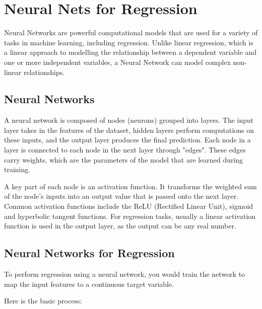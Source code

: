 \chapter{Neural Nets for Regression}

Neural Networks are powerful computational models that are used for a
variety of tasks in machine learning, including regression. Unlike
linear regression, which is a linear approach to modelling the
relationship between a dependent variable and one or more independent
variables, a Neural Network can model complex non-linear
relationships.

\section{Neural Networks}

A neural network is composed of nodes (neurons) grouped into
layers. The input layer takes in the features of the dataset, hidden
layers perform computations on these inputs, and the output layer
produces the final prediction. Each node in a layer is connected to
each node in the next layer through "edges". These edges carry
weights, which are the parameters of the model that are learned during
training.

A key part of each node is an activation function. It transforms the
weighted sum of the node's inputs into an output value that is passed
onto the next layer. Common activation functions include the ReLU
(Rectified Linear Unit), sigmoid and hyperbolic tangent functions. For
regression tasks, usually a linear activation function is used in the
output layer, as the output can be any real number.

\section{Neural Networks for Regression}

To perform regression using a neural network, you would train the
network to map the input features to a continuous target variable.

Here is the basic process:

